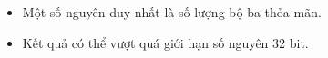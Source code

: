 \begin{itemize}
	\item Một số nguyên duy nhất là số lượng bộ ba thỏa mãn.
	\item Kết quả có thể vượt quá giới hạn số nguyên 32 bit.
\end{itemize}